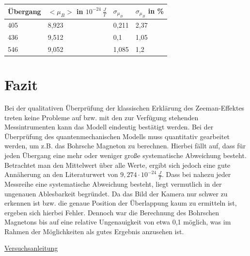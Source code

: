 \documentclass[bigchapter,colorback,accentcolor=tud4b,linedtoc,11pt]{tudreport}
\begin{document}
\begin{center}
  \begin{tabular}{|p{2cm}|p{4cm}|p{2cm}|p{2cm}|}
    \hline
    Übergang & $< \mu_B >$ in $10^{-24}~ \frac{J}{T}$ & $\sigma_{\mu_B}$ & $\sigma_{\mu_B}$ in \% \\ \hline
    405      & 8,923                                  & 0,211            & 2,37                   \\ \hline
    436      & 9,512                                  & 0,1              & 1,05                   \\ \hline
    546      & 9,052                                  & 1,085            & 1,2                    \\ \hline
    \end{tabular}
\end{center}

\chapter{Fazit}

Bei der qualitativen Überprüfung der klassischen Erklärung des Zeeman-Effektes treten keine Probleme auf bzw. mit den zur Verfügung stehenden Messintrumenten kann das Modell eindeutig bestätigt werden. Bei der Überprüfung des quantenmechanischen Modells muss quantitativ gearbeitet werden, um z.B. das Bohrsche Magneton zu berechnen. Hierbei fällt auf, dass für jeden Übergang eine mehr oder weniger große systematische Abweichung besteht. Betrachtet man den Mittelwert über alle Werte, ergibt sich jedoch eine gute Annäherung an den Literaturwert von $9,274 \cdot 10^{-24}~ \frac{J}{T}$. Dass bei nahezu jeder Messreihe eine systematische Abweichung besteht, liegt vermutlich in der ungenauen Ablesbarkeit begründet. Da das Bild der Kamera nur schwer zu erkennen ist bzw. die genaue Position der Überlappung kaum zu ermitteln ist, ergeben sich hierbei Fehler. Dennoch war die Berechnung des Bohrschen Magnetons bis auf eine relative Ungenauigkeit von etwa 0,1 möglich, was im Rahmen der Möglichkeiten als gutes Ergebnis anzusehen ist.

\cleardoublepage{}
\newpage
\begin{thebibliography}{100}
   \url{Versuchsanleitung}
\end{thebibliography}
\end{document}
